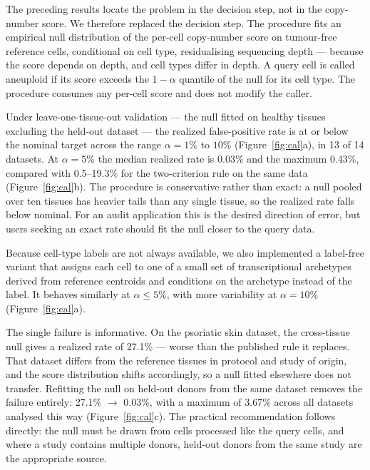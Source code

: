\documentclass[11pt]{article}
\begin{document}
The preceding results locate the problem in the decision step, not in the
copy-number score. We therefore replaced the decision step. The procedure
fits an empirical null distribution of the per-cell copy-number score on
tumour-free reference cells, conditional on cell type, residualising
sequencing depth --- because the score depends on depth, and cell types
differ in depth. A query cell is called aneuploid if its score exceeds the
$1-\alpha$ quantile of the null for its cell type. The procedure consumes any
per-cell score and does not modify the caller.

Under leave-one-tissue-out validation --- the null fitted on healthy tissues
excluding the held-out dataset --- the realized false-positive rate is at or
below the nominal target across the range $\alpha = 1\%$ to $10\%$
(Figure~\ref{fig:cal}a), in 13 of 14 datasets. At $\alpha = 5\%$ the median
realized rate is 0.03\% and the maximum 0.43\%, compared with 0.5--19.3\% for
the two-criterion rule on the same data (Figure~\ref{fig:cal}b). The
procedure is conservative rather than exact: a null pooled over ten tissues
has heavier tails than any single tissue, so the realized rate falls below
nominal. For an audit application this is the desired direction of error,
but users seeking an exact rate should fit the null closer to the query data.

Because cell-type labels are not always available, we also implemented a
label-free variant that assigns each cell to one of a small set of
transcriptional archetypes derived from reference centroids and conditions on
the archetype instead of the label. It behaves similarly at $\alpha \le 5\%$,
with more variability at $\alpha = 10\%$ (Figure~\ref{fig:cal}a).

The single failure is informative. On the psoriatic skin dataset, the
cross-tissue null gives a realized rate of 27.1\% --- worse than the
published rule it replaces. That dataset differs from the reference tissues
in protocol and study of origin, and the score distribution shifts
accordingly, so a null fitted elsewhere does not transfer. Refitting the null
on held-out donors from the same dataset removes the failure entirely: 27.1\%
$\rightarrow$ 0.03\%, with a maximum of 3.67\% across all datasets analysed
this way (Figure~\ref{fig:cal}c). The practical recommendation follows
directly: the null must be drawn from cells processed like the query cells,
and where a study contains multiple donors, held-out donors from the same
study are the appropriate source.
\end{document}
